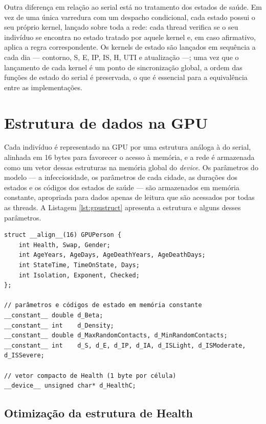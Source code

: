 \documentclass[
	12pt,				%
	openright,			%
	oneside,			%
	a4paper,			%
	english,			%
	french,				%
	spanish,			%
	brazil				%
	]{abntex2}
\begin{document}
Outra diferença em relação ao serial está no tratamento dos estados de saúde. Em vez de uma única varredura com um despacho condicional, cada estado possui o seu próprio kernel, lançado sobre toda a rede: cada thread verifica se o seu indivíduo se encontra no estado tratado por aquele kernel e, em caso afirmativo, aplica a regra correspondente. Os kernels de estado são lançados em sequência a cada dia --- contorno, S, E, IP, IS, H, UTI e atualização ---; uma vez que o lançamento de cada kernel é um ponto de sincronização global, a ordem das funções de estado do serial é preservada, o que é essencial para a equivalência entre as implementações.

\section{Estrutura de dados na GPU}

Cada indivíduo é representado na GPU por uma estrutura análoga à do serial, alinhada em 16 bytes para favorecer o acesso à memória, e a rede é armazenada como um vetor dessas estruturas na memória global do \textit{device}. Os parâmetros do modelo --- a infecciosidade, os parâmetros de cada cidade, as durações dos estados e os códigos dos estados de saúde --- são armazenados em memória constante, apropriada para dados apenas de leitura que são acessados por todas as threads. A Listagem \ref{lst:gpustruct} apresenta a estrutura e alguns desses parâmetros.

\begin{lstlisting}[caption={Estrutura do indivíduo e parâmetros em memória constante.}, label={lst:gpustruct}]
struct __align__(16) GPUPerson {
    int Health, Swap, Gender;
    int AgeYears, AgeDays, AgeDeathYears, AgeDeathDays;
    int StateTime, TimeOnState, Days;
    int Isolation, Exponent, Checked;
};

// parâmetros e códigos de estado em memória constante
__constant__ double d_Beta;
__constant__ int    d_Density;
__constant__ double d_MaxRandomContacts, d_MinRandomContacts;
__constant__ int    d_S, d_E, d_IP, d_IA, d_ISLight, d_ISModerate, d_ISSevere;

// vetor compacto de Health (1 byte por célula)
__device__ unsigned char* d_HealthC;
\end{lstlisting}

\subsection{Otimização da estrutura de Health}
\end{document}
